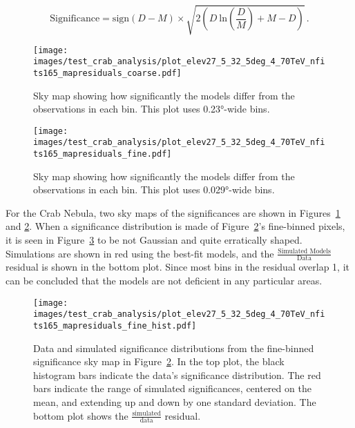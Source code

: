   \begin{equation}\label{eqn:resmap_signif}
    \textrm{Significance} = \textrm{sign}(D-M) \times \sqrt{ 2 \left ( D \: \textrm{ln} \left ( \frac{D}{M} \right ) + M - D \right ) } \,.
  \end{equation}
  
  
  \begin{figure}[t]
    \centering
    \texttt{[image: images/test\_crab\_analysis/plot\_elev27\_5\_32\_5deg\_4\_70TeV\_nfits165\_mapresiduals\_coarse.pdf]}
    \caption[Crab Residual Sky Map Coarse Binning]{
      Sky map showing how significantly the models differ from the observations in each bin.
      This plot uses \ang{0.23}-wide bins.}
    \label{fig:crab_signif_skymap_coarse}
  \end{figure}
  
  \begin{figure}[b]
    \centering
    \texttt{[image: images/test\_crab\_analysis/plot\_elev27\_5\_32\_5deg\_4\_70TeV\_nfits165\_mapresiduals\_fine.pdf]}
    \caption[Crab Residual Sky Map Fine Binning]{
      Sky map showing how significantly the models differ from the observations in each bin.
      This plot uses \ang{0.029}-wide bins.}
    \label{fig:crab_signif_skymap_fine}
  \end{figure}

  For the Crab Nebula, two sky maps of the significances are shown in Figures~\ref{fig:crab_signif_skymap_coarse} and \ref{fig:crab_signif_skymap_fine}.
  When a significance distribution is made of Figure~\ref{fig:crab_signif_skymap_fine}'s fine-binned pixels, it is seen in Figure~\ref{fig:crab_signif_distribution} to be not Gaussian and quite erratically shaped.
  Simulations are shown in red using the best-fit models, and the $\frac{\textrm{Simulated Models}}{\textrm{Data}}$ residual is shown in the bottom plot.
  Since most bins in the residual overlap 1, it can be concluded that the models are not deficient in any particular areas.
  
  \begin{figure}[h]
    \centering
    \texttt{[image: images/test\_crab\_analysis/plot\_elev27\_5\_32\_5deg\_4\_70TeV\_nfits165\_mapresiduals\_fine\_hist.pdf]}
    \caption[Crab Residual Bin Distribution]{
      Data and simulated significance distributions from the fine-binned significance sky map in Figure~\ref{fig:crab_signif_skymap_fine}.
      In the top plot, the black histogram bars indicate the data's significance distribution.
      The red bars indicate the range of simulated significances, centered on the mean, and extending up and down by one standard deviation.
      The bottom plot shows the $\frac{\textrm{simulated}}{\textrm{data}}$ residual.
    }
    \label{fig:crab_signif_distribution}
  \end{figure}
  

